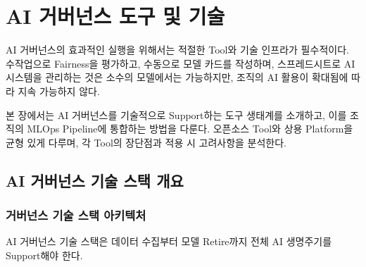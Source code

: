 
\chapter{AI 거버넌스 도구 및 기술}
\label{ch:governance_tools}

AI 거버넌스의 효과적인 실행을 위해서는 적절한 Tool와 기술 인프라가 필수적이다. 
수작업으로 Fairness을 평가하고, 수동으로 모델 카드\cite{mitchell2019model}를 작성하며, 
스프레드시트로 AI 시스템을 관리하는 것은 소수의 모델에서는 가능하지만, 
조직의 AI 활용이 확대됨에 따라 지속 가능하지 않다.

본 장에서는 AI 거버넌스를 기술적으로 Support하는 도구 생태계를 소개하고, 
이를 조직의 MLOps\cite{kreuzberger2023machine} Pipeline에 통합하는 방법을 다룬다. 
오픈소스 Tool와 상용 Platform을 균형 있게 다루며, 
각 Tool의 장단점과 적용 시 고려사항을 분석한다.


\section{AI 거버넌스 기술 스택 개요}
\label{sec:6.1}

\subsection{거버넌스 기술 스택 아키텍처}
\label{sec:6.1.1}

AI 거버넌스 기술 스택은 데이터 수집부터 모델 Retire까지 
전체 AI 생명주기를 Support해야 한다.

